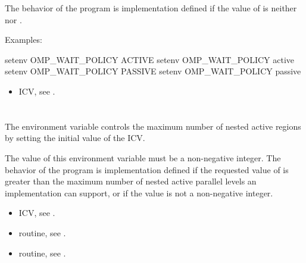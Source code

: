 The behavior of the program is implementation defined if the value of
 is neither  nor .

Examples:
\begin{ompEnv}
setenv OMP_WAIT_POLICY ACTIVE
setenv OMP_WAIT_POLICY active
setenv OMP_WAIT_POLICY PASSIVE
setenv OMP_WAIT_POLICY passive
\end{ompEnv}

\crossreferences
\begin{itemize}
\item {} ICV, see .
\end{itemize}



\section{}
\label{sec:OMP_MAX_ACTIVE_LEVELS}
The  environment variable controls the maximum number
of nested active  regions by setting the initial value of the
 ICV.

The value of this environment variable must be a non-negative integer. The
behavior of the program is implementation defined if the requested value of
 is greater than the maximum number of nested
active parallel levels an implementation can support, or if the value is not a
non-negative integer.

\crossreferences
\begin{itemize}
\item {} ICV, see .

\item {} routine, see .

\item {} routine, see .
\end{itemize}










